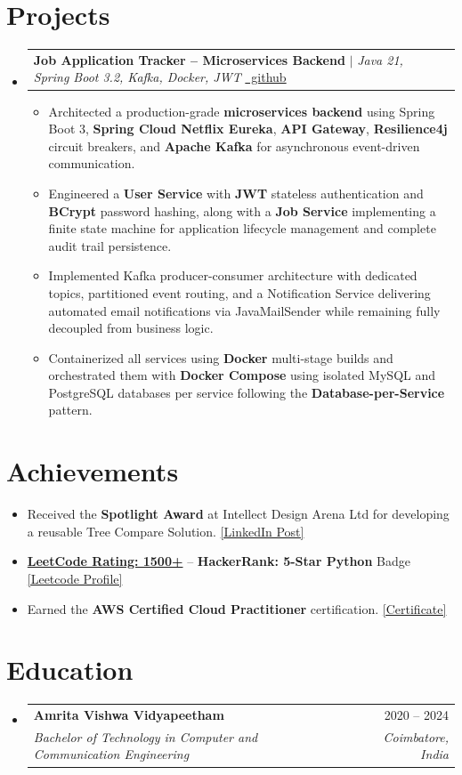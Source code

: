 \documentclass[letterpaper,10pt]{article}
\makeatletter
\newcommand{\resumeItem}[1]{
  \item\small{
    {#1 \vspace{-1pt}}
  }
}
\newcommand{\resumeSubheading}[4]{
  \vspace{-1pt}\item
    \begin{tabular*}{0.97\textwidth}[t]{l@{\extracolsep{\fill}}r}
      \textbf{#1} & #2 \\
      \textit{\small#3} & \textit{\small #4} \\
    \end{tabular*}
    \vspace{2pt}
}
\newcommand{\resumeProjectHeading}[2]{
    \item
    \begin{tabular*}{0.97\textwidth}{l@{\extracolsep{\fill}}r}
      \small#1 & #2 \\
    \end{tabular*}
    \vspace{2pt}
}
\newcommand{\resumeSubHeadingListStart}{\begin{itemize}[leftmargin=0.05in, label={}, itemsep=0pt, parsep=0pt]}
\newcommand{\resumeSubHeadingListEnd}{\end{itemize}}
\newcommand{\resumeItemListStart}{
  \begin{itemize}[leftmargin=0.15in, itemsep=1pt, topsep=1pt, parsep=0pt]
}
\newcommand{\resumeItemListEnd}{\end{itemize}\vspace{-2pt}}
\makeatother
\begin{document}
\section{Projects}
\resumeSubHeadingListStart
\resumeProjectHeading
{
  \textbf{Job Application Tracker -- Microservices Backend}
  $|$ \emph{Java 21, Spring Boot 3.2, Kafka, Docker, JWT}
  \quad
  \href{https://github.com/sivashankar-selvan/Job-tracker-microservices}{\faGithub \ github}
}{}
\resumeItemListStart
    \resumeItem{Architected a production-grade \textbf{microservices backend} using Spring Boot 3, \textbf{Spring Cloud Netflix Eureka}, \textbf{API Gateway}, \textbf{Resilience4j} circuit breakers, and \textbf{Apache Kafka} for asynchronous event-driven communication.}
    \resumeItem{Engineered a \textbf{User Service} with \textbf{JWT} stateless authentication and \textbf{BCrypt} password hashing, along with a \textbf{Job Service} implementing a finite state machine for application lifecycle management and complete audit trail persistence.}
    \resumeItem{Implemented Kafka producer-consumer architecture with dedicated topics, partitioned event routing, and a Notification Service delivering automated email notifications via JavaMailSender while remaining fully decoupled from business logic.}
    \resumeItem{Containerized all services using \textbf{Docker} multi-stage builds and orchestrated them with \textbf{Docker Compose} using isolated MySQL and PostgreSQL databases per service following the \textbf{Database-per-Service} pattern.}
\resumeItemListEnd
\resumeSubHeadingListEnd
\section{Achievements}
\resumeItemListStart
    \resumeItem{Received the \textbf{Spotlight Award} at Intellect Design Arena Ltd for developing a reusable Tree Compare Solution. \href{https://www.linkedin.com/posts/sivashankarselvan_happy-to-share-that-i-received-a-spotlight-ugcPost-7460388656839729152-rKVD/}{[LinkedIn Post]}}
    \resumeItem{\href{https://leetcode.com/u/SIVASHANKARcc/}{\textbf{LeetCode Rating: 1500+}} -- \textbf{HackerRank: 5-Star Python} Badge \href{https://leetcode.com/u/SIVASHANKARcc/}{[Leetcode Profile]}}
    \resumeItem{Earned the \textbf{AWS Certified Cloud Practitioner} certification. \href{https://drive.google.com/file/d/1suJE58zjDxi0Wdu9cJmvIh9nnjNPofn1/view}{[Certificate]}}
\resumeItemListEnd
\section{Education}
\resumeSubHeadingListStart
\resumeSubheading
  {Amrita Vishwa Vidyapeetham}{2020 -- 2024}
  {Bachelor of Technology in Computer and Communication Engineering}{Coimbatore, India}
\resumeSubHeadingListEnd
\end{document}

